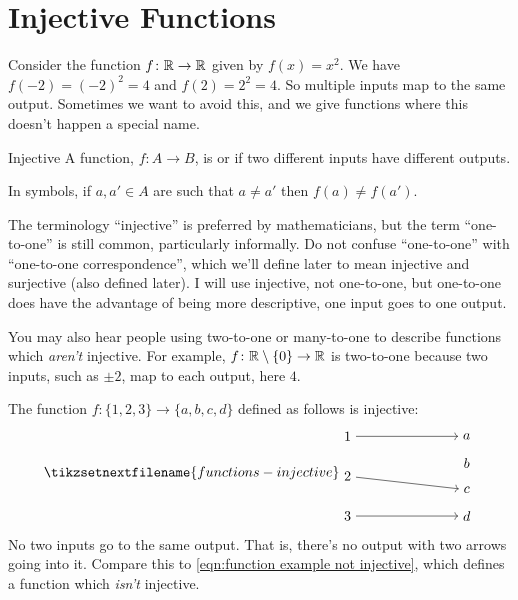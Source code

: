 \documentclass[fleqn]{LectureClass/LectureClass}
\begin{document}
    \section{Injective Functions}
    Consider the function \(f \colon \mathbb{R} \to \mathbb{R}\) given by \(f(x) = x^2\).
    We have \(f(-2) = (-2)^2 = 4\) and \(f(2) = 2^2 = 4\).
    So multiple inputs map to the same output.
    Sometimes we want to avoid this, and we give functions where this doesn't happen a special name.
    
    \begin{dfn}{Injective}{}
        A function, \(f \colon A \to B\), is  or  if two different inputs have different outputs.
        
        In symbols, if \(a, a' \in A\) are such that \(a \ne a'\) then \(f(a) \ne f(a')\).
    \end{dfn}
    
    The terminology \enquote{injective} is preferred by mathematicians, but the term \enquote{one-to-one} is still common, particularly informally.
    Do not confuse \enquote{one-to-one} with \enquote{one-to-one correspondence}, which we'll define later to mean injective and surjective (also defined later).
    I will use injective, not one-to-one, but one-to-one does have the advantage of being more descriptive, one input goes to one output.
    
    You may also hear people using two-to-one or many-to-one to describe functions which \emph{aren't} injective.
    For example, \(f \colon \mathbb{R} \setminus \{0\} \to \mathbb{R}\) is two-to-one because two inputs, such as \(\pm 2\), map to each output, here \(4\).
    
    \begin{exm}{}{}
        The function \(f \colon \{1, 2, 3\} \to \{a, b, c, d\}\) defined as follows is injective:
        \begin{equation}
            \tikzsetnextfilename{functions-injective}
            \begin{tikzpicture}[baseline=(current bounding box)]
                \node (n1) at (0, 2) {\(1\)};
                \node (n2) at (0, 1) {\(2\)};
                \node (n3) at (0, 0) {\(3\)};
                \node (a) at (3, 2) {\(a\)};
                \node (b) at (3, 1.33) {\(b\)};
                \node (c) at (3, 0.66) {\(c\)};
                \node (d) at (3, 0) {\(d\)};
                \draw [->] (n1) -- (a);
                \draw [->] (n2) -- (c);
                \draw [->] (n3) -- (d);
            \end{tikzpicture}
        \end{equation}
        No two inputs go to the same output.
        That is, there's no output with two arrows going into it.
        Compare this to \cref{eqn:function example not injective}, which defines a function which \emph{isn't } injective.
    \end{exm}
    
\end{document}
